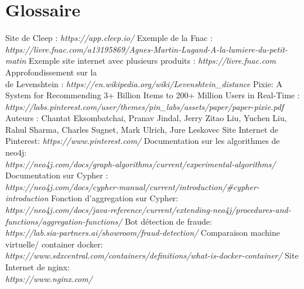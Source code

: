 \documentclass{article} %
\begin{document}
\section{Glossaire}
\begin{thebibliography}{9}
	Site de Cleep : \textit{https://app.cleep.io/}
	Exemple de la Fnac : \textit{https://livre.fnac.com/a13195869/Agnes-Martin-Lugand-A-la-lumiere-du-petit-matin}
	Exemple site internet avec plusieurs produits : \textit{https://livre.fnac.com}
	Approfondissement sur la \\
	 de Levenshtein : \textit{https://en.wikipedia.org/wiki/Levenshtein\_distance}
	Pixie: A System for Recommending 3+ Billion Items to 200+ Million Users in Real-Time :
	\textit{https://labs.pinterest.com/user/themes/pin\_labs/assets/paper/paper-pixie.pdf}\\
	Auteurs : Chantat Eksombatchai, Pranav Jindal, Jerry Zitao Liu, Yuchen Liu,
	Rahul Sharma, Charles Sugnet, Mark Ulrich, Jure Leskovec
	Site Internet de Pinterest: \textit{https://www.pinterest.com/}
	Documentation sur les algorithmes de neo4j: \\ \textit{https://neo4j.com/docs/graph-algorithms/current/experimental-algorithms/}
	Documentation sur Cypher :\\
	\textit{https://neo4j.com/docs/cypher-manual/current/introduction/\#cypher-introduction}
	Fonction d'aggregation sur Cypher:\\
	\textit{https://neo4j.com/docs/java-reference/current/extending-neo4j/procedures-and-functions/aggregation-functions/}
	Bot détection de fraude:\\
	\textit{https://lab.sia-partners.ai/showroom/fraud-detection/}
	Comparaison machine virtuelle/ container docker:\\
	\textit{https://www.sdxcentral.com/containers/definitions/what-is-docker-container/}
	Site Internet de nginx:\\
	\textit{https://www.nginx.com/}
	
\end{thebibliography}
\newpage






\imtaMakeCover
\end{document}
